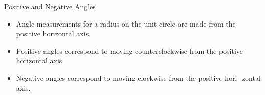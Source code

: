 \documentclass{beamer}
\begin{document}
\begin{frame}
    \begin{block}{Positive and Negative Angles}
        \begin{itemize}
            \item Angle measurements for a radius on the unit circle are made from the
            positive horizontal axis.
            \item Positive angles correspond to moving counterclockwise from the positive
            horizontal axis.
            \item Negative angles correspond to moving clockwise from the positive hori-
            zontal axis.
        \end{itemize}
    \end{block}
\end{frame}
\end{document}
